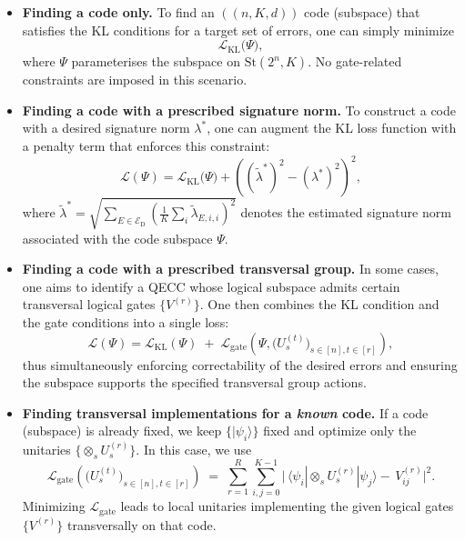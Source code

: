 \documentclass[8pt]{article}
\theoremstyle{definition}
\begin{document}
\begin{itemize}
    \item \textbf{Finding a code only.} To find an \(((n,K,d))\) code (subspace) that satisfies the KL conditions for a target set of errors, one can simply minimize
          \[ \mathcal{L}_{\mathrm{KL}}\bigl(\Psi\bigr), \]
          where \(\Psi\) parameterises the subspace on \(\mathrm{St}(2^n,K)\). No gate-related constraints are imposed in this scenario.

    \item \textbf{Finding a code with a prescribed signature norm.} To construct a code with a desired signature norm \(\lambda^*\), one can augment the KL loss function with a penalty term that enforces this constraint:
          \[ \mathcal{L}(\Psi) = \mathcal{L}_{\mathrm{KL}}\bigl(\Psi\bigr) + \left((\tilde{\lambda}^{*})^2 - (\lambda^{*})^2\right)^{2}, \]
          where \(\tilde{\lambda}^{*} = \sqrt{\sum_{E \in \mathcal{E}_{\mathrm{D}}} \left(\frac{1}{K} \sum_{i} \tilde{\lambda}_{E, i, i} \right)^{2}}\) denotes the estimated signature norm associated with the code subspace \(\Psi\).

    \item \textbf{Finding a code with a prescribed transversal group.} In some cases, one aims to identify a QECC whose logical subspace admits certain transversal logical gates \(\{V^{(r)}\}\). One then combines the KL condition and the gate conditions into a single loss:
          \[
              \mathcal{L}(\Psi)
              =
              \mathcal{L}_{\mathrm{KL}}(\Psi)
              \;+\;
              \mathcal{L}_{\mathrm{gate}}\left(\Psi, \bigl(U^{(t)}_s\bigr)_{s\in[n], t\in[r]} \right),
          \]
          thus simultaneously enforcing correctability of the desired errors and ensuring the subspace supports the specified transversal group actions.

    \item \textbf{Finding transversal implementations for a \emph{known} code.} If a code (subspace) is already fixed, we keep \(\{|\psi_i\rangle\}\) fixed and optimize only the unitaries $\{\otimes_s U^{(r)}_s\}$. In this case, we use
          \[
              \mathcal{L}_{\mathrm{gate}}\left(  \bigl(U^{(t)}_s\bigr)_{s\in[n], t\in[r]}\right)
              \;=\;
              \sum_{r=1}^R
              \sum_{i,j=0}^{K-1}
              \bigl|\,
              \langle \psi_i|\otimes_s U_s^{(r)}|\psi_j\rangle
              -\,
              V^{(r)}_{ij}\bigr|^2.
          \]
          Minimizing \(\mathcal{L}_{\mathrm{gate}}\) leads to local unitaries implementing the given logical gates \(\{V^{(r)}\}\) transversally on that code.
\end{itemize}
\end{document}
